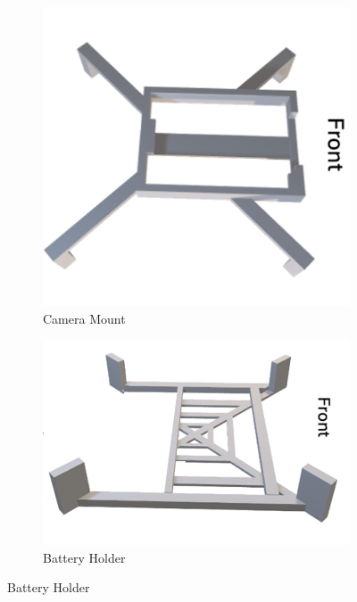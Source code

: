\begin{figure}[H]
    \centering
    \begin{subfigure}[b]{0.3\textwidth}
        \centering
        \includegraphics[width=\textwidth]{img/assembly-4b.png}
        \caption{Camera Mount}
    \end{subfigure}
    \vspace{0.5cm}
    \begin{subfigure}[b]{0.3\textwidth}
        \centering
        \includegraphics[width=\textwidth]{img/assembly-9b.png}
        \caption{Battery Holder}

\end{subfigure}
\end{figure}
